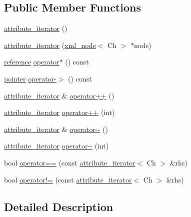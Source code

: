 \subsection*{Public Member Functions}
\begin{DoxyCompactItemize}
\item 
\hyperlink{classrapidxml_1_1attribute__iterator_a30a82132793bc59d4e7b20f5be6237b9}{attribute\_\-iterator} ()
\item 
\hyperlink{classrapidxml_1_1attribute__iterator_a1109344dead88533ae4dd68cea5d9613}{attribute\_\-iterator} (\hyperlink{classrapidxml_1_1xml__node}{xml\_\-node}$<$ Ch $>$ $\ast$node)
\item 
\hyperlink{classrapidxml_1_1xml__attribute}{reference} \hyperlink{classrapidxml_1_1attribute__iterator_a5d8616bdd2d41119e2f342d77b4f56f9}{operator$\ast$} () const 
\item 
\hyperlink{classrapidxml_1_1xml__attribute}{pointer} \hyperlink{classrapidxml_1_1attribute__iterator_a0975adffe3d178c0ac83652b9ab78791}{operator-\/$>$} () const 
\item 
\hyperlink{classrapidxml_1_1attribute__iterator}{attribute\_\-iterator} \& \hyperlink{classrapidxml_1_1attribute__iterator_afe7d15a4a1b228f97f1d4ebd4f3f6cca}{operator++} ()
\item 
\hyperlink{classrapidxml_1_1attribute__iterator}{attribute\_\-iterator} \hyperlink{classrapidxml_1_1attribute__iterator_a82c8859b9eebd45caa3afc25b9e78c36}{operator++} (int)
\item 
\hyperlink{classrapidxml_1_1attribute__iterator}{attribute\_\-iterator} \& \hyperlink{classrapidxml_1_1attribute__iterator_af22f1ad3c11d3269b43b49e29b89d7d1}{operator-\/-\/} ()
\item 
\hyperlink{classrapidxml_1_1attribute__iterator}{attribute\_\-iterator} \hyperlink{classrapidxml_1_1attribute__iterator_af52a8562ab1b2c0391cdde79f55e4a6f}{operator-\/-\/} (int)
\item 
bool \hyperlink{classrapidxml_1_1attribute__iterator_ab1dc8dd11d21e145a4e3f76d46aead0d}{operator==} (const \hyperlink{classrapidxml_1_1attribute__iterator}{attribute\_\-iterator}$<$ Ch $>$ \&rhs)
\item 
bool \hyperlink{classrapidxml_1_1attribute__iterator_a39e8cf336c324521fd9c720abf280d88}{operator!=} (const \hyperlink{classrapidxml_1_1attribute__iterator}{attribute\_\-iterator}$<$ Ch $>$ \&rhs)
\end{DoxyCompactItemize}


\subsection{Detailed Description}
